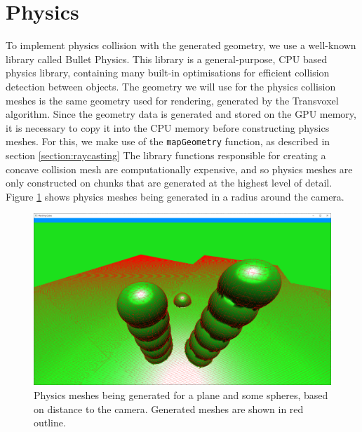 \documentclass{article}
\begin{document}
\section{Physics}
To implement physics collision with the generated geometry, we use a well-known library called Bullet Physics. This library is a general-purpose, CPU based physics library, containing many built-in optimisations for efficient collision detection between objects. %
The geometry we will use for the physics collision meshes is the same geometry used for rendering, generated by the Transvoxel algorithm. Since the geometry data is generated and stored on the GPU memory, it is necessary to copy it into the CPU memory before constructing physics meshes. For this, we make use of the \texttt{mapGeometry} function, as described in section \ref{section:raycasting}
The library functions responsible for creating a concave collision mesh are computationally expensive, and so physics meshes are only constructed on chunks that are generated at the highest level of detail. Figure \ref{fig:meshes1} shows physics meshes being generated in a radius around the camera.

\begin{figure}[H]
  \includegraphics[width=\textwidth]{meshes1.png}
  \caption{Physics meshes being generated for a plane and some spheres, based on distance to the camera. Generated meshes are shown in red outline.}
  \label{fig:meshes1}
\end{figure}
\end{document}

